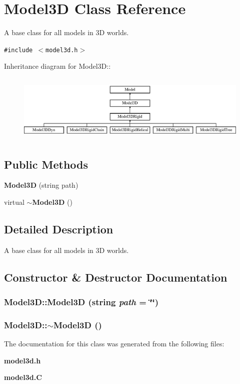 \section{Model3D  Class Reference}
\label{classModel3D}
A base class for all models in 3D worlds. 


{\tt \#include $<$model3d.h$>$}

Inheritance diagram for Model3D::\begin{figure}[H]
\begin{center}
\leavevmode
\includegraphics[height=3.24638cm]{classModel3D}
\end{center}
\end{figure}
\subsection*{Public Methods}
\begin{CompactItemize}
\item 
{\bf Model3D} (string path)
\item 
virtual {\bf $\sim$Model3D} ()
\end{CompactItemize}


\subsection{Detailed Description}
A base class for all models in 3D worlds.



\subsection{Constructor \& Destructor Documentation}
\subsubsection{\setlength{\rightskip}{0pt plus 5cm}Model3D::Model3D (string {\em path} = \char`\"{}\char`\"{})}\label{classModel3D_a0}


\subsubsection{\setlength{\rightskip}{0pt plus 5cm}Model3D::$\sim$Model3D ()\hspace{0.3cm}{\tt  [inline, virtual]}}\label{classModel3D_a1}




The documentation for this class was generated from the following files:\begin{CompactItemize}
\item 
{\bf model3d.h}\item 
{\bf model3d.C}\end{CompactItemize}

